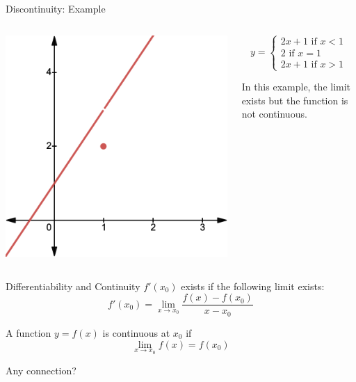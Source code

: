 \documentclass{./../../Latex/teaching_slides}
\begin{document}
\begin{frame}{Discontinuity: Example}
\vspace{1em}
\centering
\begin{columns}[c]
\begin{column}{0.6\textwidth}
\includegraphics[scale=0.225]{cont.png}
\end{column}
\begin{column}{0.4\textwidth}
$$ y = \begin{cases} 2x+1  \text{ if }x<1 \\
2 \text{ if }x=1 \\
2x+1  \text{ if }x>1 \end{cases} $$
\vspace{1em}

In this example, the limit exists but the function is not continuous. 
\end{column} 
\end{columns}
\end{frame}

\begin{frame}{Differentiability and Continuity}
$f'(x_0)$ exists if the following limit exists: 
$$  f'(x_0)= \lim_{ x \rightarrow x_0} \frac{f(x)-f(x_{0})}{x-x_0}  $$


\vspace{1em}
A function $y=f(x)$ is continuous at $x_0$ if $$\lim _{x \rightarrow x_0} f(x) = f(x_0)$$

Any connection? 
\end{frame}
\end{document}
